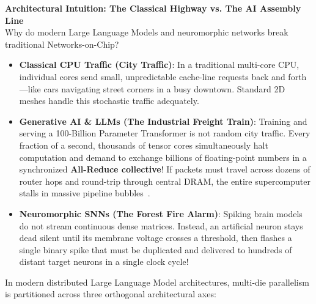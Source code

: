 \begin{svgraybox}
\textbf{Architectural Intuition: The Classical Highway vs. The AI Assembly Line} \\
Why do modern Large Language Models and neuromorphic networks break traditional Networks-on-Chip?
\begin{itemize}
    \item \textbf{Classical CPU Traffic (City Traffic)}: In a traditional multi-core CPU, individual cores send small, unpredictable cache-line requests back and forth—like cars navigating street corners in a busy downtown. Standard 2D meshes handle this stochastic traffic adequately.
    \item \textbf{Generative AI \& LLMs (The Industrial Freight Train)}: Training and serving a 100-Billion Parameter Transformer is not random city traffic. Every fraction of a second, thousands of tensor cores simultaneously halt computation and demand to exchange billions of floating-point numbers in a synchronized \textbf{All-Reduce collective}! If packets must travel across dozens of router hops and round-trip through central DRAM, the entire supercomputer stalls in massive pipeline bubbles~\cite{Ouyang2026PAC}.
    \item \textbf{Neuromorphic SNNs (The Forest Fire Alarm)}: Spiking brain models do not stream continuous dense matrices. Instead, an artificial neuron stays dead silent until its membrane voltage crosses a threshold, then flashes a single binary spike that must be duplicated and delivered to hundreds of distant target neurons in a single clock cycle!
\end{itemize}
\end{svgraybox}

In modern distributed Large Language Model architectures, multi-die parallelism is partitioned across three orthogonal architectural axes:

